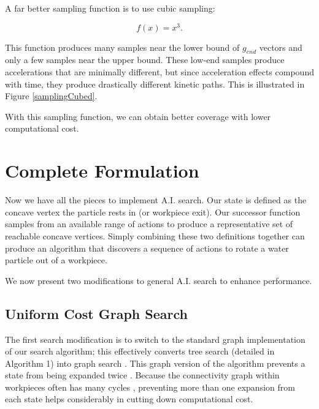 
A far better sampling function is to use cubic sampling:

$$
f(x) = x^3.
$$

This function produces many samples near the lower bound of $g_{end}$ vectors and only a few samples near the upper bound. These low-end samples produce accelerations that are minimally different, but since acceleration effects compound with time, they produce drastically different kinetic paths. This is illustrated in Figure \ref{samplingCubed}.


With this sampling function, we can obtain better coverage with lower computational cost.

	\section{Complete Formulation}

Now we have all the pieces to implement A.I. search. Our state is defined as the concave vertex the particle rests in (or workpiece exit). Our successor function samples from an available range of actions to produce a representative set of reachable concave vertices. Simply combining these two definitions together can produce an algorithm that discovers a sequence of actions to rotate a water particle out of a workpiece.

We now present two modifications to general A.I. search to enhance performance.

	\subsection{Uniform Cost Graph Search}

The first search modification is to switch to the standard graph implementation of our search algorithm; this effectively converts tree search (detailed in Algorithm 1) into graph search \cite{AIBook}. This graph version of the algorithm prevents a state from being expanded twice \cite{AIBook}. Because the connectivity graph within workpieces often has many cycles \cite{Yasui2011}, preventing more than one expansion from each state helps considerably in cutting down computational cost.

